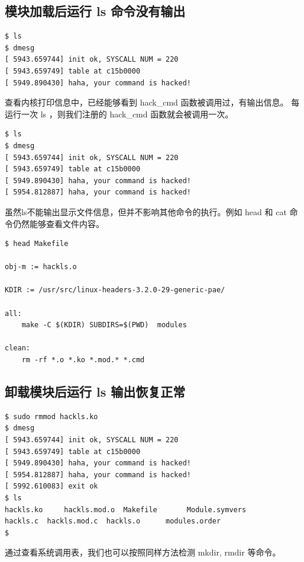 \subsection{模块加载后运行 ls 命令没有输出}

{\begin{shaded}\begin{verbatim}
$ ls
$ dmesg 
[ 5943.659744] init ok, SYSCALL NUM = 220
[ 5943.659749] table at c15b0000
[ 5949.890430] haha, your command is hacked!
\end{verbatim}\end{shaded}}
查看内核打印信息中，已经能够看到 hack\_cmd 函数被调用过，有输出信息。
每运行一次 ls ，则我们注册的 hack\_cmd 函数就会被调用一次。

{\begin{shaded}\begin{verbatim}
$ ls
$ dmesg 
[ 5943.659744] init ok, SYSCALL NUM = 220
[ 5943.659749] table at c15b0000
[ 5949.890430] haha, your command is hacked!
[ 5954.812887] haha, your command is hacked!
\end{verbatim}\end{shaded}}
虽然ls不能输出显示文件信息，但并不影响其他命令的执行。例如 head 和 cat
命令仍然能够查看文件内容。

{\begin{shaded}\begin{verbatim}
$ head Makefile

obj-m := hackls.o

KDIR := /usr/src/linux-headers-3.2.0-29-generic-pae/

all:
    make -C $(KDIR) SUBDIRS=$(PWD)  modules

clean:
    rm -rf *.o *.ko *.mod.* *.cmd 
\end{verbatim}\end{shaded}}
\subsection{卸载模块后运行 ls 输出恢复正常}

{\begin{shaded}\begin{verbatim}
$ sudo rmmod hackls.ko
$ dmesg 
[ 5943.659744] init ok, SYSCALL NUM = 220
[ 5943.659749] table at c15b0000
[ 5949.890430] haha, your command is hacked!
[ 5954.812887] haha, your command is hacked!
[ 5992.610083] exit ok
$ ls
hackls.ko     hackls.mod.o  Makefile       Module.symvers
hackls.c  hackls.mod.c  hackls.o      modules.order
$ 
\end{verbatim}\end{shaded}}
通过查看系统调用表，我们也可以按照同样方法检测 mkdir, rmdir 等命令。

